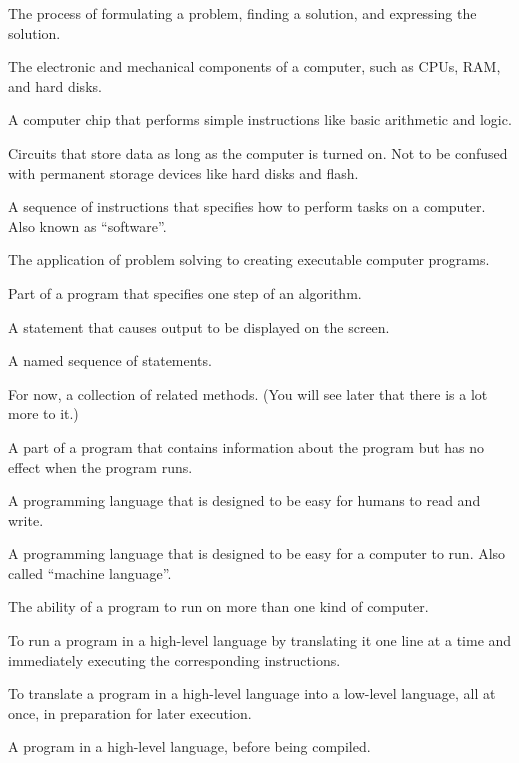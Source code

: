 \begin{description}

The process of formulating a problem, finding a solution, and expressing the solution.

The electronic and mechanical components of a computer, such as CPUs, RAM, and hard disks.

A computer chip that performs simple instructions like basic arithmetic and logic.

Circuits that store data as long as the computer is turned on.
Not to be confused with permanent storage devices like hard disks and flash.

A sequence of instructions that specifies how to perform tasks on a computer.
Also known as ``software''.

The application of problem solving to creating executable computer programs.

Part of a program that specifies one step of an algorithm.

A statement that causes output to be displayed on the screen.

A named sequence of statements.

For now, a collection of related methods.
(You will see later that there is a lot more to it.)

A part of a program that contains information about the program but has no effect when the program runs.

A programming language that is designed to be easy for humans to read and write.

A programming language that is designed to be easy for a computer to run.
Also called ``machine language''. %

The ability of a program to run on more than one kind of computer.

To run a program in a high-level language by translating it one line at a time and immediately executing the corresponding instructions.

To translate a program in a high-level language into a low-level language, all at once, in preparation for later execution.

A program in a high-level language, before being compiled.


\end{description}
